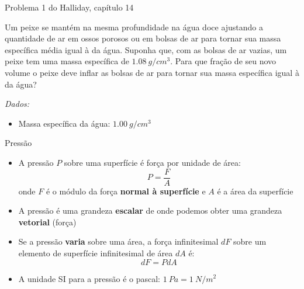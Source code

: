 \documentclass[t,%
brazilian,%
11pt,%
aspectratio=169,%
table%
]{beamer}
\begin{document}
\begin{frame}{Problema 1 do Halliday, capítulo 14}
    \begin{minipage}{\textwidth}
        Um peixe se mantém na mesma profundidade na água doce ajustando a quantidade
        de ar em ossos porosos ou em bolsas de ar para tornar sua massa específica média
        igual à da água. Suponha que, com as bolsas de ar vazias, um peixe tem uma massa
        específica de \(\SI{1,08}{g/cm^3}\). Para que fração de seu novo volume o peixe deve inflar
        as bolsas de ar para tornar sua massa específica igual à da água?
    \end{minipage}

    \vspace{1cm}
    \textit{Dados:}
    \begin{itemize}
        \item Massa específica da água: \(\SI{1,00}{g/cm^3}\)
    \end{itemize}
\end{frame}

\begin{frame}{Pressão}

    \begin{itemize}
        \item A pressão $P$ sobre uma superfície é força por unidade de área:
            \[
                P=\frac{F}{A}
            \]
            onde $F$ é o módulo da força \textbf{normal à superfície} e $A$ é a área da superfície
        \item A pressão é uma grandeza \textbf{escalar} de onde podemos obter uma grandeza \textbf{vetorial} (força)

        \item Se a pressão \textbf{varia} sobre uma área, a força infinitesimal
            $dF$ sobre um elemento de superfície infinitesimal de área $dA$ é:
            \[
                dF=P dA
            \]
        \item A unidade SI para a pressão é o pascal: $\SI{1}{Pa} = \SI{1}{N/m^2}$
    \end{itemize}
\end{frame}
\end{document}
